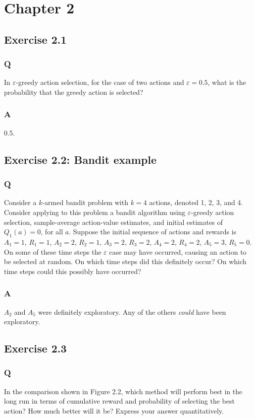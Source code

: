 \documentclass[a4paper, oneside, 11pt]{article}
\begin{document}
\section{Chapter 2}
\subsection{Exercise 2.1}
\subsubsection{Q}
In $\varepsilon$-greedy action selection, for the case of two actions and $\varepsilon = 0.5$, what is the probability that the greedy action is selected?

\subsubsection{A}
0.5.


\subsection{Exercise 2.2: Bandit example}
\subsubsection{Q}
Consider a $k$-armed bandit problem with $k = 4$ actions, denoted 1, 2, 3, and 4. Consider applying to this problem a bandit algorithm using $\varepsilon$-greedy action selection, sample-average action-value estimates, and initial estimates of $Q_1(a) = 0$, for all $a$. Suppose the initial sequence of actions and rewards is $A_1 = 1$, $R_1 =1$, $A_2 =2$, $R_2 =1$, $A_3 =2$, $R_3 =2$, $A_4 =2$, $R_4 =2$, $A_5 =3$, $R_5 =0$. On some of these time steps the $\varepsilon$ case may have occurred, causing an action to be selected at random. On which time steps did this definitely occur? On which time steps could this possibly have occurred?

\subsubsection{A}
$A_2$ and $A_5$ were definitely exploratory. Any of the others \emph{could} have been exploratory.


\subsection{Exercise 2.3}
\subsubsection{Q}
In the comparison shown in Figure 2.2, which method will perform best in the long run in terms of cumulative reward and probability of selecting the best action? How much better will it be? Express your answer quantitatively.
\end{document}
